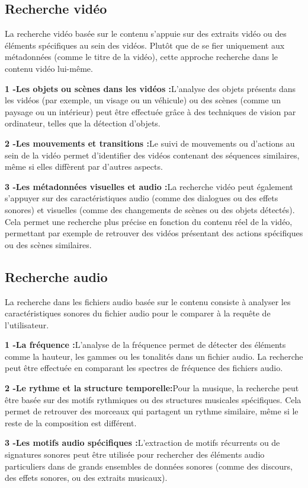 \begin{section}
 \subsection{Recherche vidéo}
 La recherche vidéo basée sur le contenu s’appuie sur des extraits vidéo ou des
 éléments spécifiques au sein des vidéos. Plutôt que de se fier uniquement aux
 métadonnées (comme le titre de la vidéo), cette approche recherche dans le
 contenu vidéo lui-même.

 \par \textbf{1 -Les objets ou scènes dans les vidéos :}L’analyse des objets présents dans les vidéos (par exemple, un visage ou un véhicule) ou des scènes (comme un paysage ou un intérieur) peut être effectuée grâce à des techniques de vision par ordinateur, telles que la détection d'objets.
 \par \textbf{2 -Les mouvements et transitions :}Le suivi de mouvements ou d'actions au sein de la vidéo permet d'identifier des vidéos contenant des séquences similaires, même si elles diffèrent par d'autres aspects.
 \par \textbf{3 -Les métadonnées visuelles et audio :}La recherche vidéo peut également s’appuyer sur des caractéristiques audio (comme des dialogues ou des effets sonores) et visuelles (comme des changements de scènes ou des objets détectés). Cela permet une recherche plus précise en fonction du contenu réel de la vidéo, permettant par exemple de retrouver des vidéos présentant des actions spécifiques ou des scènes similaires.
 \subsection{Recherche audio}
 La recherche dans les fichiers audio basée sur le contenu consiste à analyser
 les caractéristiques sonores du fichier audio pour le comparer à la requête de
 l'utilisateur.
 \par \textbf{1 -La fréquence :}L'analyse de la fréquence permet de détecter des éléments comme la hauteur, les gammes ou les tonalités dans un fichier audio. La recherche peut être effectuée en comparant les spectres de fréquence des fichiers audio.
 \par \textbf{2 -Le rythme et la structure temporelle:}Pour la musique, la recherche peut être basée sur des motifs rythmiques ou des structures musicales spécifiques. Cela permet de retrouver des morceaux qui partagent un rythme similaire, même si le reste de la composition est différent.
 \par \textbf{3 -Les motifs audio spécifiques :}L'extraction de motifs récurrents ou de signatures sonores peut être utilisée pour rechercher des éléments audio particuliers dans de grands ensembles de données sonores (comme des discours, des effets sonores, ou des extraits musicaux).


\end{section}
